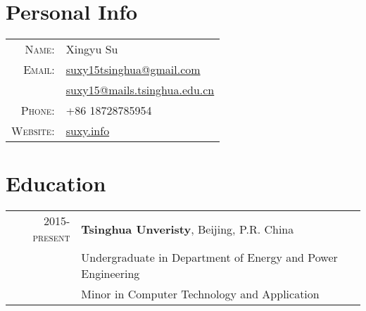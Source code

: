 \documentclass[a4paper,10pt]{article}
\begin{document}
\pagestyle{empty} %

\par{\bigskip\par}

\section{Personal Info}
\begin{tabular}{rl}
    \textsc{Name:}          & Xingyu Su \\
    \textsc{Email:}         & \href{mailto:suxy15tsinghua@gmail.com}{suxy15tsinghua@gmail.com} \\
                            & \href{mailto:suxy15@mails.tsinghua.edu.cn}{suxy15@mails.tsinghua.edu.cn} \\
    \textsc{Phone:}         & +86 18728785954 \\
    \textsc{Website:}       & \href{http://suxy.info}{suxy.info} \\
\end{tabular}

\section{Education}
\begin{tabular}{rl}
\textsc{2015-present} & \normalsize\textbf{Tsinghua Unveristy}, Beijing, P.R. China \\
                      & Undergraduate in Department of Energy and Power Engineering \\
                      & Minor in Computer Technology and Application \\
\end{tabular}

\end{document}
